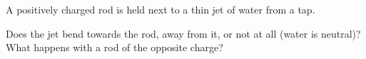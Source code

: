A positively charged rod is held next to a thin jet of water from a tap.

\begin{abcliste}
\abc Does the jet bend towards the rod, away from it, or not at all (water is neutral)?
\abc What happens with a rod of the opposite charge?
\end{abcliste}
